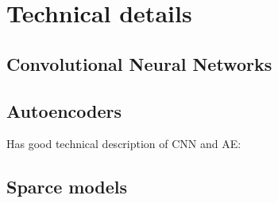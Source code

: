 
\chapter{Technical details}
\label{cha:tede}

\section{Convolutional Neural Networks}


\section{Autoencoders}
Has good technical description of CNN and AE: \cite{Masci2011}

\section{Sparce models}
